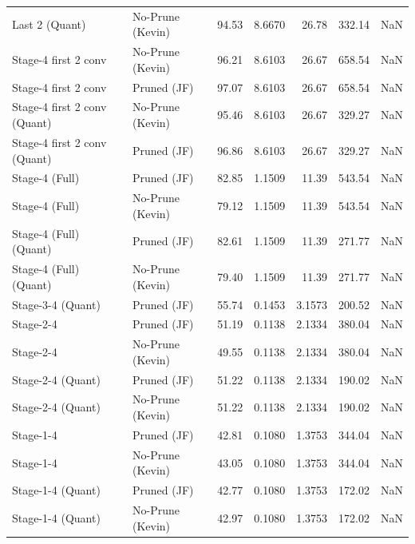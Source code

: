 \begin{table}
\begin{tabular}{llrrrrl}
Last 2
(Quant) & No-Prune (Kevin) & 94.53 & 8.6670 & 26.78 & 332.14 & NaN \\
Stage-4 first 2 conv & No-Prune (Kevin) & 96.21 & 8.6103 & 26.67 & 658.54 & NaN \\
Stage-4 first 2 conv & Pruned (JF) & 97.07 & 8.6103 & 26.67 & 658.54 & NaN \\
Stage-4 first 2 conv
(Quant) & No-Prune (Kevin) & 95.46 & 8.6103 & 26.67 & 329.27 & NaN \\
Stage-4 first 2 conv
(Quant) & Pruned (JF) & 96.86 & 8.6103 & 26.67 & 329.27 & NaN \\
Stage-4 (Full) & Pruned (JF) & 82.85 & 1.1509 & 11.39 & 543.54 & NaN \\
Stage-4 (Full) & No-Prune (Kevin) & 79.12 & 1.1509 & 11.39 & 543.54 & NaN \\
Stage-4 (Full)
(Quant) & Pruned (JF) & 82.61 & 1.1509 & 11.39 & 271.77 & NaN \\
Stage-4 (Full)
(Quant) & No-Prune (Kevin) & 79.40 & 1.1509 & 11.39 & 271.77 & NaN \\
Stage-3-4
(Quant) & Pruned (JF) & 55.74 & 0.1453 & 3.1573 & 200.52 & NaN \\
Stage-2-4 & Pruned (JF) & 51.19 & 0.1138 & 2.1334 & 380.04 & NaN \\
Stage-2-4 & No-Prune (Kevin) & 49.55 & 0.1138 & 2.1334 & 380.04 & NaN \\
Stage-2-4
(Quant) & Pruned (JF) & 51.22 & 0.1138 & 2.1334 & 190.02 & NaN \\
Stage-2-4
(Quant) & No-Prune (Kevin) & 51.22 & 0.1138 & 2.1334 & 190.02 & NaN \\
Stage-1-4 & Pruned (JF) & 42.81 & 0.1080 & 1.3753 & 344.04 & NaN \\
Stage-1-4 & No-Prune (Kevin) & 43.05 & 0.1080 & 1.3753 & 344.04 & NaN \\
Stage-1-4
(Quant) & Pruned (JF) & 42.77 & 0.1080 & 1.3753 & 172.02 & NaN \\
Stage-1-4
(Quant) & No-Prune (Kevin) & 42.97 & 0.1080 & 1.3753 & 172.02 & NaN \\
\bottomrule
\end{tabular}
\end{table}
